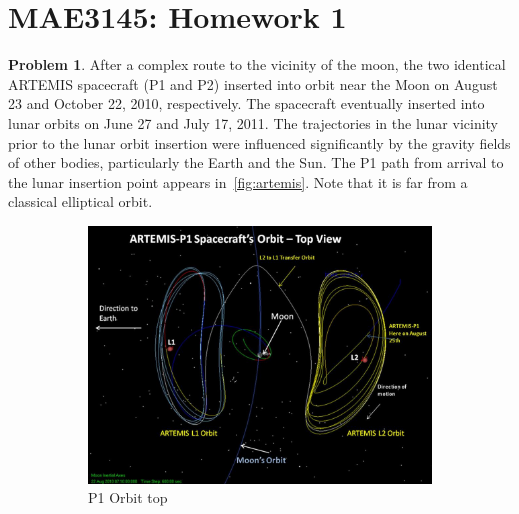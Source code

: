 \documentclass[10pt]{article}
\date{}
\theoremstyle{definition}
\newtheorem{prob}{Problem}[section]
\begin{document}
\pagestyle{empty}
\section*{MAE3145: Homework 1}
\vspace*{-0.4cm}

\begin{prob}
    After a complex route to the vicinity of the moon, the two identical ARTEMIS spacecraft (P1 and P2) inserted into orbit near the Moon on August 23 and October 22, 2010, respectively. 
    The spacecraft eventually inserted into lunar orbits on June 27 and July 17, 2011.
    The trajectories in the lunar vicinity prior to the lunar orbit insertion were influenced significantly by the gravity fields of other bodies, particularly the Earth and the Sun. 
    The P1 path from arrival to the lunar insertion point appears in~\cref{fig:artemis}.
    Note that it is far from a classical elliptical orbit.
    \begin{figure}[htbp]
        \centering
        \begin{subfigure}[htbp]{0.5\textwidth} 
            \includegraphics[width=\textwidth, keepaspectratio]{figures/artemis_top.jpg} 
            \caption{P1 Orbit top \label{fig:top_view}} 
        \end{subfigure}~
        \begin{subfigure}[htbp]{0.5\textwidth} 

\end{subfigure}
\end{figure}
\end{prob}
\end{document}
